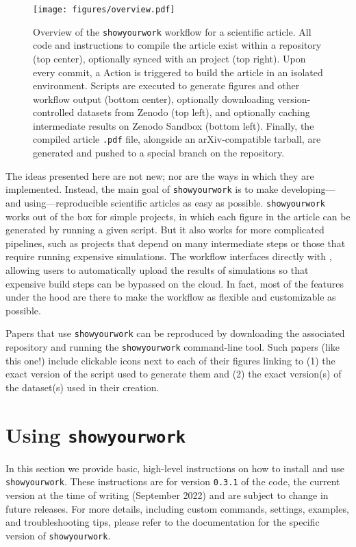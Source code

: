 \documentclass{aastex631}
\newcommand\VERSION{\texttt{0.3.1}\xspace}
\newcommand\MONTHYEAR{September 2022}
\newcommand\syw{\texttt{showyourwork}\xspace}
\newcommand\pdf{\texttt{.pdf}\xspace}
\begin{document}
\begin{figure}[t!]
    \begin{centering}
        \texttt{[image: figures/overview.pdf]}
        \caption{
            Overview of the \syw workflow for a scientific article.
            All code and instructions to compile the article exist within a \GitHub repository (top center), optionally synced with an \Overleaf project (top right).
            Upon every commit, a \GitHub Action is triggered to build the article in an isolated environment.
            Scripts are executed to generate figures and other workflow output (bottom center), optionally downloading version-controlled datasets from Zenodo (top left), and optionally caching intermediate results on Zenodo Sandbox (bottom left).
            Finally, the compiled article \pdf file, alongside an arXiv-compatible tarball, are generated and pushed to a special branch on the \GitHub repository.
        }
        \label{fig:overview}
    \end{centering}
\end{figure}

The ideas presented here are not new; nor are the ways in which they are implemented.
Instead, the main goal of \syw is to make developing---and using---reproducible scientific articles as easy as possible.
\syw works out of the box for simple projects, in which each figure in the article can be generated by running a given script. 
But it also works for more complicated pipelines, such as projects that depend on many intermediate steps or those that require running expensive simulations. 
The workflow interfaces directly with \Zenodo, allowing users to automatically upload the results of simulations so that expensive build steps can be bypassed on the cloud. 
In fact, most of the features under the hood are there to make the workflow as flexible and customizable as possible.

Papers that use \syw can be reproduced by downloading the associated repository and running the \syw command-line tool. 
Such papers (like this one!) include clickable icons next to each of their figures linking to (1) the exact version of the script used to generate them and (2) the exact version(s) of the dataset(s) used in their creation.

\section{Using {\protect\syw}}
\label{sec:usage}
In this section we provide basic, high-level instructions on how to install and use \syw.
These instructions are for version \VERSION of the code, the current version at the time of writing (\MONTHYEAR) and are subject to change in future releases.
For more details, including custom commands, settings, examples, and troubleshooting tips, please refer to the documentation for the specific version of \syw.
\end{document}
